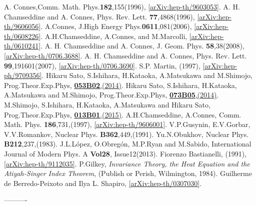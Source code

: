 \documentclass{ptephy}%
\begin{document}
\begin{thebibliography}{99}
A. Connes,Comm. Math. Phys.{\bf 182},155(1996), %
\href{http://arxiv.org/abs/hep-th/9603053}{[arXiv:hep-th/9603053]}. 
A. H. Chamseddine and A. Connes, Phys. Rev. Lett. {\bf 77},4868(1996),
\href{http://arxiv.org/abs/hep-th/9606056}{[arXiv:hep-th/9606056]}. 
A.Connes, J.High Energy Phys.{\bf 0611},081(2006), 
\href{http://arxiv.org/pdf/hep-th/0608226v2.pdf}{[arXiv:hep-th/0608226]}.
A.H.Chamseddine, A.Connes, and M.Marcolli, \href{http://arxiv.org/abs/hep-th/0610241}{[arXiv:hep-th/0610241]}. 
A. H. Chamseddine and A. Connes, J. Geom. Phys. {\bf 58},38(2008), 
\href{https://arxiv.org/abs/0706.3688}{[arXiv:hep-th/0706.3688]}.
A. H. Chamseddine and A. Connes, Phys. Rev. Lett. {\bf 99},191601(2007), 
\href{https://arxiv.org/abs/0706.3690}{[arXiv:hep-th/0706.3690]}. 
S.P. Martin, (1997), \href{https://arxiv.org/pdf/hep-ph/9709356v7.pdf}{[arXiv:hep-ph/9709356]}.
Hikaru Sato, S.Ishihara, H.Kataoka, A.Matsukawa and M.Shimojo, 
Prog.Theor.Exp.Phys, \href{http://ptep.oxfordjournals.org/content/2014/5}{{\bf 053B02},(2014)}. 
Hikaru Sato, S.Ishihara, H.Kataoka, A.Matsukawa and M.Shimojo, 
Prog.Theor.Exp.Phys, \href{http://ptep.oxfordjournals.org/content/2014/7}{{\bf 073B05},(2014)}. 
M.Shimojo, S.Ishihara, H.Kataoka, A.Matsukawa and Hikaru Sato, 
Prog.Theor.Exp.Phys, \href{http://ptep.oxfordjournals.org/content/2015/1}{{\bf 013B01},(2015)}. 
A.H.Chamseddine, A.Connes, Comm. Math. Phys. {\bf 186},731,(1997), 
\href{http://arxiv.org/abs/hep-th/9606001}{[arXiv:hep-th/9606001]}.
V.P.Gusynin, E.V.Gorbar, V.V.Romankov, Nuclear Phys. {\bf B362},449,(1991).
Yu.N.Obukhov, Nuclear Phys. {\bf B212},237,(1983). 
J.L.L\'{o}pez, O.Obreg\'{o}n, M.P.Ryan and M.Sabido, 
International Journal of Modern Phys. A {\bf Vol28}, Issue12(2013).
Fiorenzo Bastianelli, (1991), \href{https://arxiv.org/abs/hep-th/9112035}{[arXiv:hep-th/9112035]}.
P.Gilkey, {\it Invariance Theory, the Heat Equation and the Atiyah-Singer Index Theorem}, 
(Publish or Perish, Wilmington, 1984).
Guilherme de Berredo-Peixoto and Ilya L. Shapiro,
\href{http://arxiv.org/abs/hep-th/0307030}{[arXiv:hep-th/0307030]}.
\end{thebibliography}
----------

\end{document}
